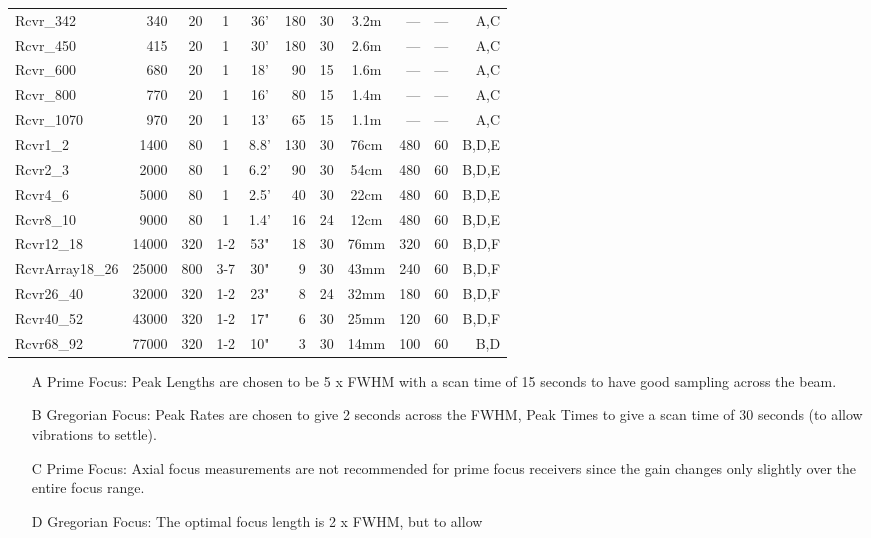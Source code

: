 \begin{table}[!h]
\begin{center}
{\begin{tabular}{lrrccrrcrrr}
\midrule
Rcvr\_342       & 340   & 20  & 1   & 36'  & 180 & 30  & 3.2m & --- & ---  & A,C \\
Rcvr\_450       & 415   & 20  & 1   & 30'  & 180 & 30  & 2.6m & --- & ---  & A,C\\
Rcvr\_600       & 680   & 20  & 1   & 18'  &  90 & 15  & 1.6m & --- & ---  & A,C\\
Rcvr\_800       & 770   & 20  & 1   & 16'  &  80 & 15  & 1.4m & --- & ---  & A,C\\
Rcvr\_1070      & 970   & 20  & 1   & 13'  &  65 & 15  & 1.1m & --- & ---  & A,C\\
Rcvr1\_2        & 1400  & 80  & 1   & 8.8' & 130 & 30  & 76cm & 480 &  60  & B,D,E\\
Rcvr2\_3        & 2000  & 80  & 1   & 6.2' &  90 & 30  & 54cm & 480 &  60  & B,D,E\\
Rcvr4\_6        & 5000  & 80  & 1   & 2.5' &  40 & 30  & 22cm & 480 &  60  & B,D,E\\
Rcvr8\_10       & 9000  & 80  & 1   & 1.4' &  16 & 24  & 12cm & 480 &  60  & B,D,E\\
Rcvr12\_18      & 14000 & 320 & 1-2 & 53"  &  18 & 30  & 76mm & 320 &  60  & B,D,F\\
RcvrArray18\_26 & 25000 & 800 & 3-7 & 30"  &   9 & 30  & 43mm & 240 &  60  & B,D,F\\
Rcvr26\_40      & 32000 & 320 & 1-2 & 23"  &   8 & 24  & 32mm & 180 &  60  & B,D,F\\
Rcvr40\_52      & 43000 & 320 & 1-2 & 17"  &   6 & 30  & 25mm & 120 &  60  & B,D,F\\
Rcvr68\_92      & 77000 & 320 & 1-2 & 10"  &   3 & 30  & 14mm & 100 &  60  & B,D\\
\bottomrule
\end{tabular}
}
\end{center}
{\footnotesize
\begin{itemize}[leftmargin=*,font=\bfseries]
\item[A] Prime Focus: Peak Lengths are chosen to be 5 x \gls{FWHM} with a scan 
time of 15 seconds to have good sampling across the beam. 
\item[B] Gregorian Focus: Peak Rates are chosen to give 2 seconds across 
the \gls{FWHM}, Peak Times to give a scan time of 30 seconds (to allow vibrations to 
settle).
\item[C] Prime Focus: Axial focus measurements are not recommended for prime
focus receivers
since the gain changes only slightly over the entire focus range.
\item[D] Gregorian Focus: The optimal focus length is 2 x \gls{FWHM}, but to allow 

\end{itemize}}
\end{table}
